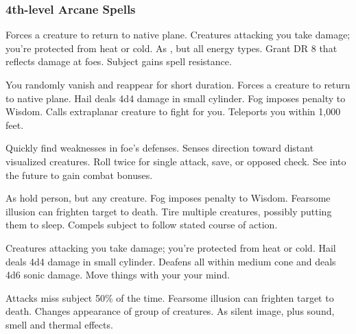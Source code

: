 \subsubsection{4th-level Arcane Spells} 
\begin{swspelllist}
   Forces a creature to return to native plane.
   Creatures attacking you take damage; you're protected from heat or cold.   As , but all energy types.
   Grant DR 8 that reflects damage at foes.
   Subject gains spell resistance.

   You randomly vanish and reappear for short duration.
   Forces a creature to return to native plane.
   Hail deals 4d4 damage in small cylinder.
   Fog imposes  penalty to Wisdom.
   Calls extraplanar creature to fight for you.
   Teleports you within 1,000 feet.

   Quickly find weaknesses in foe's defenses.
   Senses direction toward distant visualized creatures.
   Roll twice for single attack, save, or opposed check.
   See into the future to gain combat bonuses.

   As hold person, but any creature.
   Fog imposes  penalty to Wisdom.
   Fearsome illusion can frighten target to death.
   Tire multiple creatures, possibly putting them to sleep.
   Compels subject to follow stated course of action.

   Creatures attacking you take damage; you're protected from heat or cold.
   Hail deals 4d4 damage in small cylinder.
   Deafens all within medium cone and deals 4d6 sonic damage.
   Move things with your your mind.

   Attacks miss subject 50\% of the time.
   Fearsome illusion can frighten target to death.
   Changes appearance of group of creatures.
   As silent image, plus sound, smell and thermal effects.


\end{swspelllist}
